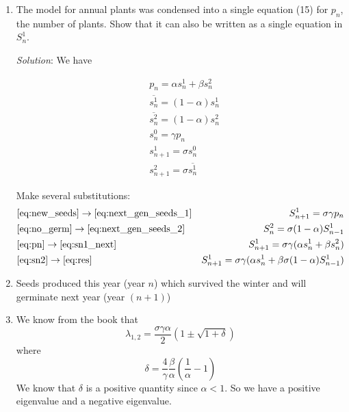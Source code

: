\documentclass[
    classnum=MATH564,
    classname=MATHEMATICAL\ MODELING,
    due=January\ 28\,\ 2020,
    author=Gabrielle\ Streeter\qquad Hannah\ Wu\qquad\ Minghang\ Li,
    authorshort=Streeter\ \&\ Wu\ \&\ Li,
    teacher= Zachary\ M.\ Boyd,
    hw=1
]{hw-template}
\begin{document}
\begin{homeworkProblem}
\begin{enumerate}
    \item The model for annual plants was condensed into a single equation (15)
    for $p_n$, the number of plants. Show that it can also be written as a single
    equation in $S_n^1$.

    \textit{Solution}: We have

    \begin{align}
        &p_n = \alpha s_n^1 + \beta s_n^2 \label{eq:pn} \\
        &\overline{s_n^1} = (1-\alpha)s_n^1 \label{eq:no_germ}\\
        &\overline{s_n^2} = (1-\alpha)s_n^2\\
        &s_n^0=\gamma p_n \label{eq:new_seeds}\\
        &s_{n+1}^1 = \sigma s_n^0 \label{eq:next_gen_seeds_1}\\
        &s_{n+1}^2 = \sigma \overline{s_n^1} \label{eq:next_gen_seeds_2}
    \end{align}

    Make several substitutions:
    \begin{align}
        &\eqref{eq:new_seeds} \rightarrow \eqref{eq:next_gen_seeds_1}
        & S_{n+1}^1 = \sigma \gamma p_n & \label{eq:sn1_next} \\
        &\eqref{eq:no_germ} \rightarrow \eqref{eq:next_gen_seeds_2}
        & S_{n}^2 = \sigma (1-\alpha) S_{n-1}^1 & \label{eq:sn2}\\
        &\eqref{eq:pn} \rightarrow \eqref{eq:sn1_next}
        & S_{n+1}^1 = \sigma \gamma (\alpha s_n^1 + \beta s_n^2) & \label{eq:res}\\
        &\eqref{eq:sn2} \rightarrow \eqref{eq:res}
        &S_{n+1}^1 = \sigma \gamma (\alpha s_n^1 + \beta \sigma (1-\alpha) S_{n-1}^1) &
    \end{align}

    \item Seeds produced this year (year $n$) which survived the winter and will
    germinate next year (year $(n+1)$)

    \item We know from the book that \[
        \lambda_{1,2} = \frac{\sigma \gamma \alpha}{2} (1 \pm \sqrt{1 + \delta})
    \] where \[
        \delta = \frac{4}{\gamma}\frac{\beta}{\alpha} \left( \frac{1}{\alpha} - 1\right)
    \]
    We know that $\delta$ is a positive quantity since $\alpha < 1$. So we have 
    a positive eigenvalue and a negative eigenvalue.


\end{enumerate}
\end{homeworkProblem}
\end{document}
